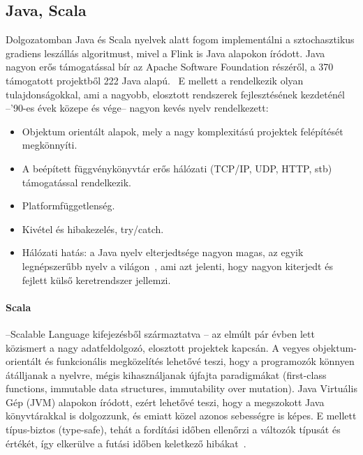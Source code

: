 \documentclass[a4paper,12pt]{article}
\begin{document}
\subsection{Java, Scala}
Dolgozatomban Java és Scala nyelvek alatt fogom implementálni a sztochasztikus gradiens leszállás algoritmust, mivel a Flink is Java alapokon íródott. Java nagyon erős támogatással bír az Apache Software Foundation részéről, a 370 támogatott projektből 222 Java alapú.~\cite{asf} E mellett a rendelkezik olyan tulajdonságokkal, ami a nagyobb, elosztott rendszerek fejlesztésének kezdeténél --'90-es évek közepe és vége-- nagyon kevés nyelv rendelkezett:
\begin{itemize}
\item Objektum orientált alapok, mely a nagy komplexitású projektek felépítését megkönnyíti.
\item A beépített függvénykönyvtár erős hálózati (TCP/IP, UDP, HTTP, stb) támogatással rendelkezik.
\item Platformfüggetlenség.
\item Kivétel és hibakezelés, try/catch.
\item Hálózati hatás: a Java nyelv elterjedtsége nagyon magas, az egyik legnépszerűbb nyelv a világon~\cite{tiobe}, ami azt jelenti, hogy nagyon kiterjedt és fejlett külső keretrendszer jellemzi.
\end{itemize}

\paragraph{Scala}\hspace*{-0.3cm}--Scalable Language kifejezésből származtatva \cite{odersky}-- az elmúlt pár évben lett közismert a nagy adatfeldolgozó, elosztott projektek kapcsán. A vegyes objektum-orientált és funkcionális megközelítés lehetővé teszi, hogy a programozók könnyen átálljanak a nyelvre, mégis kihasználjanak újfajta paradigmákat (first-class functions, immutable data structures, immutability over mutation). Java Virtuális Gép (JVM) alapokon íródott, ezért lehetővé teszi, hogy a megszokott Java könyvtárakkal is dolgozzunk, és emiatt közel azonos sebességre is képes.  E mellett típus-biztos (type-safe), tehát a fordítási időben ellenőrzi a változók típusát és értékét, így elkerülve a futási időben keletkező hibákat~\cite{toptal}. 
\end{document}
